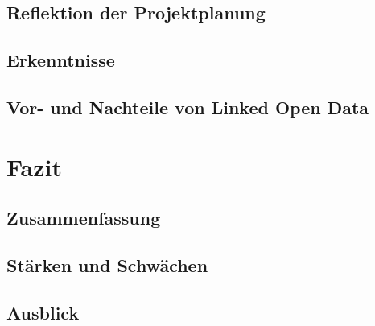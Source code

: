 \documentclass[a4paper, 11pt]{article}
\begin{document}
\subsection{Reflektion der Projektplanung}
\subsection{Erkenntnisse}
\subsection{Vor- und Nachteile von Linked Open Data}
\newpage
\section{Fazit}
\subsection{Zusammenfassung}
\subsection{Stärken und Schwächen}
\subsection{Ausblick}

  
\end{document}
